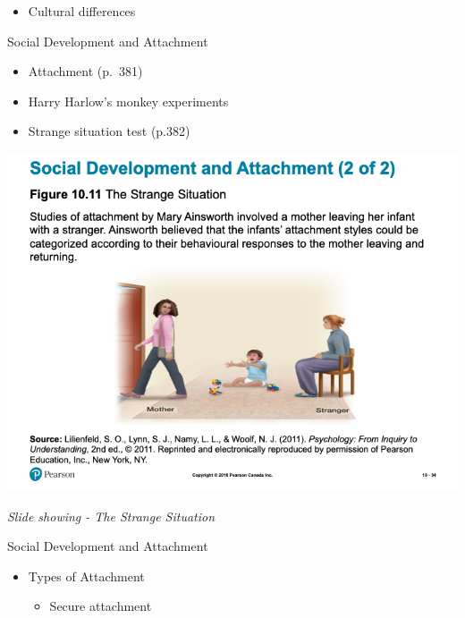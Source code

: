 \documentclass[
]{book}
\providecommand{\tightlist}{%
  \setlength{\itemsep}{0pt}\setlength{\parskip}{0pt}}
\begin{document}
\begin{reflect}
\begin{itemize}
\begin{itemize}
\begin{itemize}
      \begin{itemize}
      \tightlist
      \item
        Cultural differences
      \end{itemize}
    \end{itemize}
  \end{itemize}
\end{itemize}

Social Development and Attachment

\begin{itemize}
\tightlist
\item
  Attachment (p.~381)\\
\item
  Harry Harlow's monkey experiments\\
\item
  Strange situation test (p.382)
\end{itemize}

\includegraphics{assets/unit_3/slide_34.png}

\emph{Slide showing - The Strange Situation}

Social Development and Attachment

\begin{itemize}
\tightlist
\item
  Types of Attachment

  \begin{itemize}
  \tightlist
  \item
    Secure attachment


\end{itemize}
\end{itemize}
\end{reflect}
\end{document}
